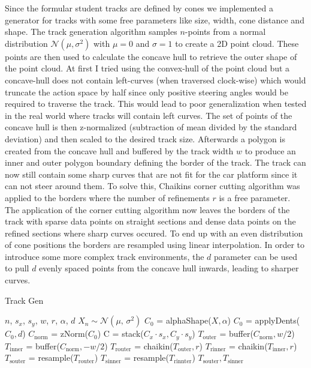 Since the formular student tracks are defined by cones we implemented a generator for tracks with some free parameters like size, width, cone distance and shape.
The track generation algorithm samples $n$-points from a normal distribution $\mathcal{N}(\mu, \sigma^2)$ with $\mu = 0$ and $\sigma = 1$ to create a 2D point cloud. These points are then used to calculate the concave hull to retrieve the outer shape of the point cloud. At first I tried using the convex-hull of the point cloud but a concave-hull does not contain left-curves (when traversed clock-wise) which would truncate the action space by half since only positive steering angles would be required to traverse the track. This would lead to poor generalization when tested in the real world where tracks will contain left curves. The set of points of the concave hull is then z-normalized (subtraction of mean divided by the standard deviation) and then scaled to the desired track size.
Afterwards a polygon is created from the concave hull and buffered by the track width $w$ to produce an inner and outer polygon boundary defining the border of the track. The track can now still contain some sharp curves that are not fit for the car platform since it can not steer around them. To solve this, Chaikins corner cutting algorithm \cite{chaikin1974algorithm} was applied to the borders where the number of refinements $r$ is a free parameter.
\newline
The application of the corner cutting algorithm now leaves the borders of the track with sparse data points on straight sections and dense data points on the refined sections where sharp curves occured. To end up with an even distribution of cone positions the borders are resampled using linear interpolation.
In order to introduce some more complex track environments, the $d$ parameter can be used to pull $d$ evenly spaced points from the concave hull inwards, leading to sharper curves.

\begin{algorithm}[tb]
\caption{Track Gen}
\label{alg:track-gen}
\begin{algorithmic}
 $n$, $s_x$, $s_y$, $w$, $r$, $\alpha$, $d$
\State $X_n \sim \mathcal{N}(\mu,\,\sigma^{2})$
\State $C_0$ = alphaShape($X, \alpha$)
\State $C_0$ = applyDents($C_0, d$)
\State $C_\text{norm}$ = zNorm($C_0$)
\State C = stack($C_x \cdot s_x, C_y \cdot s_y$)
\State $T_\text{outer}$ = buffer($C_\text{norm}, w/2$)
\State $T_\text{inner}$ = buffer($C_\text{norm}, -w/2$)
\State $T_\text{router}$ = chaikin($T_\text{outer}, r$)
\State $T_\text{rinner}$ = chaikin($T_\text{inner}, r$)
\State $T_\text{souter}$ = resample($T_\text{router}$)
\State $T_\text{sinner}$ = resample($T_\text{rinnter}$)
 $T_\text{souter}, T_\text{sinner}$
\end{algorithmic}
\end{algorithm}

